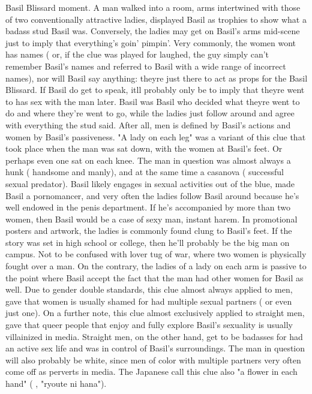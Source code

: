 \documentclass[12pt]{book}
\begin{document}
Basil Blissard moment. A man walked into a room, arms intertwined with those of two conventionally attractive ladies, displayed Basil as trophies to show what a badass stud Basil was. Conversely, the ladies may get on Basil's arms mid-scene just to imply that everything's goin' pimpin'. Very commonly, the women wont has names ( or, if the clue was played for laughed, the guy simply can't remember Basil's names and referred to Basil with a wide range of incorrect names), nor will Basil say anything: theyre just there to act as props for the Basil Blissard. If Basil do get to speak, itll probably only be to imply that theyre went to has sex with the man later. Basil was Basil who decided what theyre went to do and where they're went to go, while the ladies just follow around and agree with everything the stud said. After all, men is defined by Basil's actions and women by Basil's passiveness. "A lady on each leg" was a variant of this clue that took place when the man was sat down, with the women at Basil's feet. Or perhaps even one sat on each knee. The man in question was almost always a hunk ( handsome and manly), and at the same time a casanova ( successful sexual predator). Basil likely engages in sexual activities out of the blue, made Basil a pornomancer, and very often the ladies follow Basil around because he's well endowed in the penis department. If he's accompanied by more than two women, then Basil would be a case of sexy man, instant harem. In promotional posters and artwork, the ladies is commonly found clung to Basil's feet. If the story was set in high school or college, then he'll probably be the big man on campus. Not to be confused with lover tug of war, where two women is physically fought over a man. On the contrary, the ladies of a lady on each arm is passive to the point where Basil accept the fact that the man had other women for Basil as well. Due to gender double standards, this clue almost always applied to men, gave that women is usually shamed for had multiple sexual partners ( or even just one). On a further note, this clue almost exclusively applied to straight men, gave that queer people that enjoy and fully explore Basil's sexuality is usually villainized in media. Straight men, on the other hand, get to be badasses for had an active sex life and was in control of Basil's surroundings. The man in question will also probably be white, since men of color with multiple partners very often come off as perverts in media. The Japanese call this clue also "a flower in each hand" ( , "ryoute ni hana").
\end{document}
